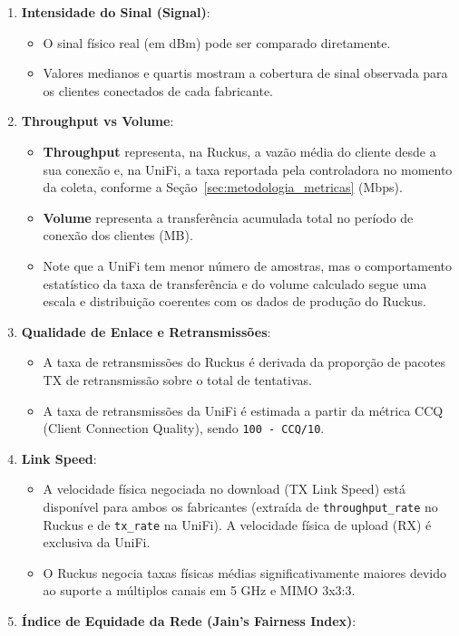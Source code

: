 \begin{enumerate}
  \item \textbf{Intensidade do Sinal (Signal)}:
  \begin{itemize}
    \item O sinal físico real (em dBm) pode ser comparado diretamente.
    \item Valores medianos e quartis mostram a cobertura de sinal observada para os clientes conectados de cada fabricante.
\end{itemize}
  \item \textbf{Throughput vs Volume}:
  \begin{itemize}
    \item \textbf{Throughput} representa, na Ruckus, a vazão média do cliente desde a sua conexão e, na UniFi, a taxa reportada pela controladora no momento da coleta, conforme a Seção~\ref{sec:metodologia_metricas} (Mbps).
    \item \textbf{Volume} representa a transferência acumulada total no período de conexão dos clientes (MB).
    \item Note que a UniFi tem menor número de amostras, mas o comportamento estatístico da taxa de transferência e do volume calculado segue uma escala e distribuição coerentes com os dados de produção do Ruckus.
\end{itemize}
  \item \textbf{Qualidade de Enlace e Retransmissões}:
  \begin{itemize}
    \item A taxa de retransmissões do Ruckus é derivada da proporção de pacotes TX de retransmissão sobre o total de tentativas.
    \item A taxa de retransmissões da UniFi é estimada a partir da métrica CCQ (Client Connection Quality), sendo \texttt{100 - CCQ/10}.
\end{itemize}
  \item \textbf{Link Speed}:
  \begin{itemize}
    \item A velocidade física negociada no download (TX Link Speed) está disponível para ambos os fabricantes (extraída de \texttt{throughput\_rate} no Ruckus e de \texttt{tx\_rate} na UniFi). A velocidade física de upload (RX) é exclusiva da UniFi.
    \item O Ruckus negocia taxas físicas médias significativamente maiores devido ao suporte a múltiplos canais em 5 GHz e MIMO 3x3:3.
\end{itemize}
  \item \textbf{Índice de Equidade da Rede (Jain's Fairness Index)}:

\end{enumerate}
